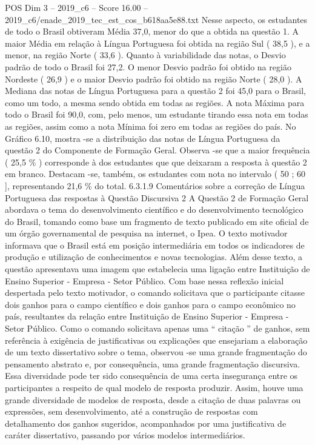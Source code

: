 \begin{textsample}{POS Dim 3 – 2019\_c6 – Score 16.00 – 2019\_c6/enade\_2019\_tec\_est\_cos\_b618aa5e88.txt}
Nesse aspecto, os estudantes de todo o Brasil obtiveram Média 37,0, menor do que a obtida na questão 1.
A maior Média em relação à Língua Portuguesa foi obtida na região Sul ( 38,5 ), e a menor, na região Norte ( 33,6 ).
Quanto à variabilidade das notas, o Desvio padrão de todo o Brasil foi 27,2.
O menor Desvio padrão foi obtido na região Nordeste ( 26,9 ) e o maior Desvio padrão foi obtido na região Norte ( 28,0 ).
A Mediana das notas de Língua Portuguesa para a questão 2 foi 45,0 para o Brasil, como um todo, a mesma sendo obtida em todas as regiões.
A nota Máxima para todo o Brasil foi 90,0, com, pelo menos, um estudante tirando essa nota em todas as regiões, assim como a nota Mínima foi zero em todas as regiões do país.
No Gráfico 6.10, mostra -se a distribuição das notas de Língua Portuguesa da questão 2 do Componente de Formação Geral.
Observa -se que a maior frequência ( 25,5 \% ) corresponde à dos estudantes que que deixaram a resposta à questão 2 em branco.
Destacam -se, também, os estudantes com nota no intervalo ( 50 ; 60 ], representando 21,6 \% do total. 6.3.1.9 Comentários sobre a correção de Língua Portuguesa das respostas à Questão Discursiva 2 A Questão 2 de Formação Geral abordava o tema do desenvolvimento científico e do desenvolvimento tecnológico do Brasil, tomando como base um fragmento de texto publicado em site oficial de um órgão governamental de pesquisa na internet, o Ipea.
O texto motivador informava que o Brasil está em posição intermediária em todos os indicadores de produção e utilização de conhecimentos e novas tecnologias.
Além desse texto, a questão apresentava uma imagem que estabelecia uma ligação entre Instituição de Ensino Superior - Empresa - Setor Público.
Com base nessa reflexão inicial despertada pelo texto motivador, o comando solicitava que o participante citasse dois ganhos para o campo científico e dois ganhos para o campo econômico no país, resultantes da relação entre Instituição de Ensino Superior - Empresa - Setor Público.
Como o comando solicitava apenas uma “ citação ” de ganhos, sem referência à exigência de justificativas ou explicações que ensejariam a elaboração de um texto dissertativo sobre o tema, observou -se uma grande fragmentação do pensamento abstrato e, por consequência, uma grande fragmentação discursiva.
Essa diversidade pode ter sido consequência de uma certa insegurança entre os participantes a respeito de qual modelo de resposta produzir.
Assim, houve uma grande diversidade de modelos de resposta, desde a citação de duas palavras ou expressões, sem desenvolvimento, até a construção de respostas com detalhamento dos ganhos sugeridos, acompanhados por uma justificativa de caráter dissertativo, passando por vários modelos intermediários.

\end{textsample}
